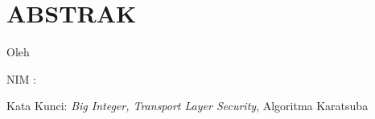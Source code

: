 \clearpage
\chapter*{ABSTRAK}

\begin{center}
  \large \bfseries \MakeUppercase{\thetitle}

  \normalsize \normalfont Oleh

  \theauthor

  NIM : \thestudentnumber
\end{center}


\begin{singlespacing}

\Blindtext

\end{singlespacing}


Kata Kunci: \textit{Big Integer, Transport Layer Security}, Algoritma Karatsuba
